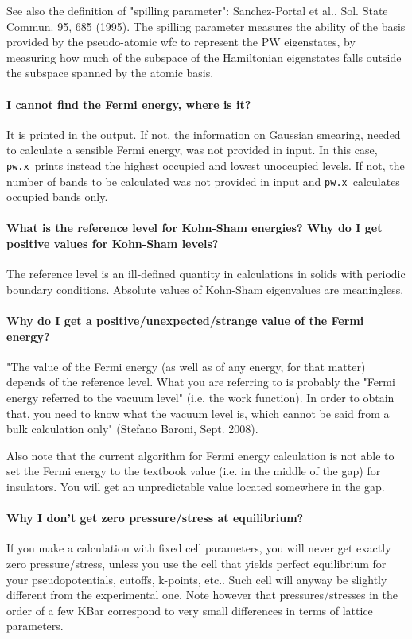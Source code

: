 \documentclass[12pt,a4paper]{article}
\def\pwx{\texttt{pw.x}}
\begin{document}
See also the definition of "spilling parameter": Sanchez-Portal et
al., Sol. State Commun. 95, 685 (1995). The spilling parameter
measures the ability of the basis provided by the pseudo-atomic wfc to
represent the PW eigenstates, by measuring how much of the subspace of
the Hamiltonian eigenstates falls outside the subspace spanned by the
atomic basis. 

\paragraph{I cannot find the Fermi energy, where is it?}  

It is printed in the output. If not, the information on Gaussian smearing,
needed to calculate a sensible Fermi energy, was not provided in input.
In this case, \pwx\ prints instead the highest occupied and lowest
unoccupied levels. If not, the number of bands to be calculated was not 
provided in input and \pwx\ calculates occupied bands only.

\paragraph{What is the reference level for Kohn-Sham energies? 
Why do I get positive values for Kohn-Sham levels?}

The reference level is an ill-defined quantity in calculations
in solids with periodic boundary conditions. Absolute values of
Kohn-Sham eigenvalues are meaningless. 

\paragraph{Why do I get a positive/unexpected/strange value
of the Fermi energy?}

"The value of the Fermi energy (as well as of any energy, for that
matter) depends of the reference level. What you are referring to is
probably the "Fermi energy referred to the vacuum level" (i.e.  
the work function). In order to obtain that, you need to know what the
vacuum level is, which cannot be said from a bulk calculation only"
(Stefano Baroni, Sept. 2008). 

Also note that the current algorithm for Fermi energy calculation 
is not able to set the Fermi energy to the textbook value (i.e. in the
middle of the gap) for insulators. You will get an unpredictable 
value located somewhere in the gap.

\paragraph{Why I don't get zero pressure/stress at equilibrium?}
If you make a calculation with fixed cell parameters, you
will never get exactly zero pressure/stress, unless you use the cell
that yields perfect equilibrium for your pseudopotentials,  cutoffs,
k-points, etc.. Such cell will anyway be slightly different from the
experimental one. Note however that pressures/stresses in the order of
a few KBar correspond to very small differences in terms of lattice parameters.
\end{document}
